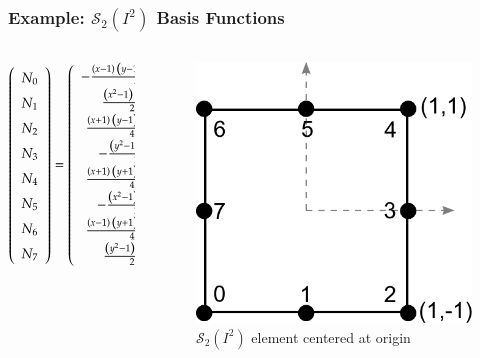 \documentclass[serif,12pt]{beamer}
\begin{document}
\begin{frame}
\frametitle{Example: $\mathcal{S}_2(I^2)$ Basis Functions}
\begin{columns}
	\begin{column}{0.6\linewidth}
		
		$\left(\renewcommand{\arraystretch}{1.5}\begin{array}{c} N_0\\N_1\\N_2\\N_3\\N_4\\N_5\\N_6\\N_7\end{array}\right)=\left(\renewcommand{\arraystretch}{1.5}\begin{array}{c} -\frac{\left(x - 1\right)\, \left(y - 1\right)\, \left(x + y + 1\right)}{4}\\ \frac{\left(x^2 - 1\right)\, \left(y - 1\right)}{2}\\ \frac{\left(x + 1\right)\, \left(y - 1\right)\, \left(y - x + 1\right)}{4}\\ -\frac{\left(y^2 - 1\right)\, \left(x + 1\right)}{2}\\ \frac{\left(x + 1\right)\, \left(y + 1\right)\, \left(x + y - 1\right)}{4}\\ -\frac{\left(x^2 - 1\right)\, \left(y + 1\right)}{2}\\ \frac{\left(x - 1\right)\, \left(y + 1\right)\, \left(x - y + 1\right)}{4}\\ \frac{\left(y^2 - 1\right)\, \left(x - 1\right)}{2} \end{array}\right)
$

	\end{column}

	\begin{column}{0.4\linewidth}
		\begin{figure}
			\includegraphics[width=.8\textwidth]{figures/r2d2_labels_2.pdf}
			\caption{$\mathcal{S}_2(I^2)$ element centered at origin}
		\end{figure}
	\end{column}
\end{columns}
\end{frame}
\end{document}

